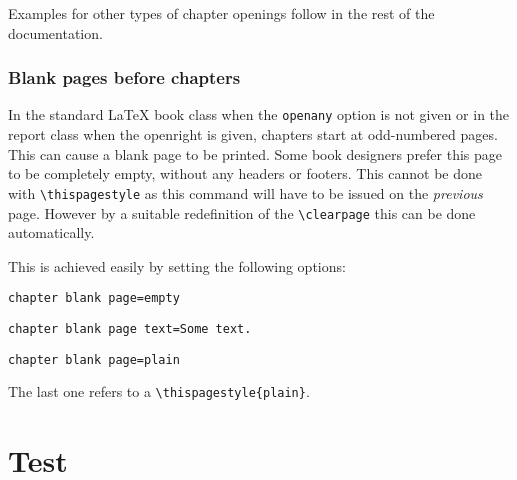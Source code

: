 \begin{decription}
\addtocounter{chapter}{-1}

Examples for other types of chapter openings follow in the rest of the documentation.

\subsection{Blank pages before chapters}

In the standard LaTeX book class when the \texttt{openany} option is not given or in the report class when the openright is given, chapters start at odd-numbered pages. This can cause a blank page to be printed. Some book designers prefer this page to be completely empty, without any headers or footers. This cannot be done with \lstinline{\thispagestyle} as this command will have to be issued on the \textit{previous} page. However by a suitable redefinition of the
\lstinline{\clearpage} this can be done automatically.
\medskip

\begin{teXXX}
\makeatletter
\def\cleardoublepage{\clearpage\if@twoside\ifodd\c@page\else
  \hbox{}
  \vspace*{\fill}
  \begin{center}
    This page left intentionally blank.
  \end{center}
  \vspace{\fill}
  \thispagestyle{empty}
  \newpage
  \if@twocolumn\hbox{}\newpage\fi\fi\fi}
\makeatother
\end{teXXX}


This is achieved easily by setting the following options:
\bigskip

\begin{tcolorbox}
\lstinline{chapter blank page=empty}\par
\lstinline{chapter blank page text=Some text.}\par
\lstinline{chapter blank page=plain}\par
\end{tcolorbox}
\medskip



The last one refers to a \lstinline!\thispagestyle{plain}!.
\chapter{Test}





\end{decription}
